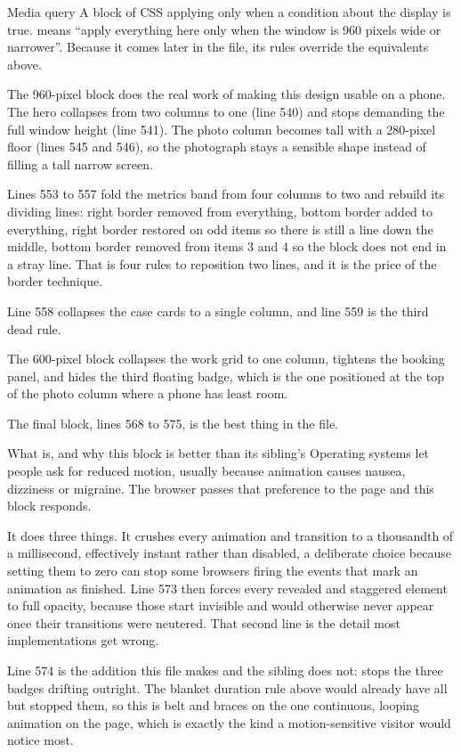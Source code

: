 \begin{jargon}{Media query}
A block of CSS applying only when a condition about the display is true.
 means ``apply everything here only when the window
is 960 pixels wide or narrower''. Because it comes later in the file, its rules
override the equivalents above.
\end{jargon}

The 960-pixel block does the real work of making this design usable on a phone. The
hero collapses from two columns to one (line 540) and stops demanding the full
window height (line 541). The photo column becomes  tall with a
280-pixel floor (lines 545 and 546), so the photograph stays a sensible shape
instead of filling a tall narrow screen.

Lines 553 to 557 fold the metrics band from four columns to two and rebuild its
dividing lines: right border removed from everything, bottom border added to
everything, right border restored on odd items so there is still a line down the
middle, bottom border removed from items 3 and 4 so the block does not end in a
stray line. That is four rules to reposition two lines, and it is the price of the
border technique.

Line 558 collapses the case cards to a single column, and line 559 is the third dead
rule.

The 600-pixel block collapses the work grid to one column, tightens the booking
panel, and hides the third floating badge, which is the one positioned at the top
of the photo column where a phone has least room.

The final block, lines 568 to 575, is the best thing in the file.

\begin{keyidea}{What  is, and why this block is better
than its sibling's}
Operating systems let people ask for reduced motion, usually because animation
causes nausea, dizziness or migraine. The browser passes that preference to the
page and this block responds.

It does three things. It crushes every animation and transition to a thousandth of
a millisecond, effectively instant rather than disabled, a deliberate choice because
setting them to zero can stop some browsers firing the events that mark an animation
as finished. Line 573 then forces every revealed and staggered element to full
opacity, because those start invisible and would otherwise never appear once their
transitions were neutered. That second line is the detail most implementations get
wrong.

Line 574 is the addition this file makes and the sibling does not:
 stops the three badges drifting
outright. The blanket duration rule above would already have all but stopped them,
so this is belt and braces on the one continuous, looping animation on the page,
which is exactly the kind a motion-sensitive visitor would notice most.
\end{keyidea}

